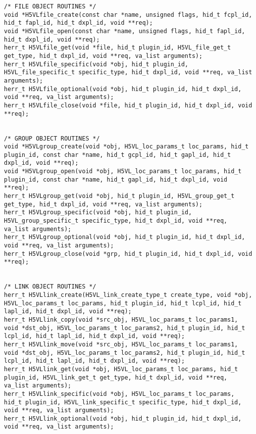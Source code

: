\begin{lstlisting}
/* FILE OBJECT ROUTINES */
void *H5VLfile_create(const char *name, unsigned flags, hid_t fcpl_id, hid_t fapl_id, hid_t dxpl_id, void **req);
void *H5VLfile_open(const char *name, unsigned flags, hid_t fapl_id, hid_t dxpl_id, void **req);
herr_t H5VLfile_get(void *file, hid_t plugin_id, H5VL_file_get_t get_type, hid_t dxpl_id, void **req, va_list arguments);
herr_t H5VLfile_specific(void *obj, hid_t plugin_id, H5VL_file_specific_t specific_type, hid_t dxpl_id, void **req, va_list arguments);
herr_t H5VLfile_optional(void *obj, hid_t plugin_id, hid_t dxpl_id, void **req, va_list arguments);
herr_t H5VLfile_close(void *file, hid_t plugin_id, hid_t dxpl_id, void **req);


/* GROUP OBJECT ROUTINES */
void *H5VLgroup_create(void *obj, H5VL_loc_params_t loc_params, hid_t plugin_id, const char *name, hid_t gcpl_id, hid_t gapl_id, hid_t dxpl_id, void **req);
void *H5VLgroup_open(void *obj, H5VL_loc_params_t loc_params, hid_t plugin_id, const char *name, hid_t gapl_id, hid_t dxpl_id, void **req);
herr_t H5VLgroup_get(void *obj, hid_t plugin_id, H5VL_group_get_t get_type, hid_t dxpl_id, void **req, va_list arguments);
herr_t H5VLgroup_specific(void *obj, hid_t plugin_id, H5VL_group_specific_t specific_type, hid_t dxpl_id, void **req, va_list arguments);
herr_t H5VLgroup_optional(void *obj, hid_t plugin_id, hid_t dxpl_id, void **req, va_list arguments);
herr_t H5VLgroup_close(void *grp, hid_t plugin_id, hid_t dxpl_id, void **req);


/* LINK OBJECT ROUTINES */
herr_t H5VLlink_create(H5VL_link_create_type_t create_type, void *obj, H5VL_loc_params_t loc_params, hid_t plugin_id, hid_t lcpl_id, hid_t lapl_id, hid_t dxpl_id, void **req);
herr_t H5VLlink_copy(void *src_obj, H5VL_loc_params_t loc_params1, void *dst_obj, H5VL_loc_params_t loc_params2, hid_t plugin_id, hid_t lcpl_id, hid_t lapl_id, hid_t dxpl_id, void **req);
herr_t H5VLlink_move(void *src_obj, H5VL_loc_params_t loc_params1, void *dst_obj, H5VL_loc_params_t loc_params2, hid_t plugin_id, hid_t lcpl_id, hid_t lapl_id, hid_t dxpl_id, void **req);
herr_t H5VLlink_get(void *obj, H5VL_loc_params_t loc_params, hid_t plugin_id, H5VL_link_get_t get_type, hid_t dxpl_id, void **req, va_list arguments);
herr_t H5VLlink_specific(void *obj, H5VL_loc_params_t loc_params, hid_t plugin_id, H5VL_link_specific_t specific_type, hid_t dxpl_id, void **req, va_list arguments);
herr_t H5VLlink_optional(void *obj, hid_t plugin_id, hid_t dxpl_id, void **req, va_list arguments);



\end{lstlisting}
